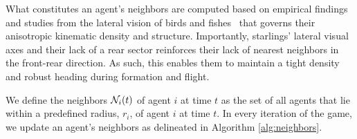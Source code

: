 %
What constitutes an agent's neighbors are computed based on empirical findings and studies from the lateral vision of birds and fishes~\cite{Ballerini1232, JadbabaieCoord, Helbing20} that governs their anisotropic kinematic density and structure. Importantly, starlings' lateral visual axes and their lack of a rear sector reinforces their lack of nearest neighbors in the front-rear direction. As such, this enables them to maintain a tight density and robust heading during formation and flight.

\begin{definition}
	We define the neighbors $\mathcal{N}_i(t)$ of agent $i$ at time $t$ as the set of all agents that lie within a predefined radius, $r_i$, of agent $i$ at time $t$. In every iteration of the game, we update an agent's neighbors as delineated in Algorithm \ref{alg:neighbors}.
\end{definition}
%
